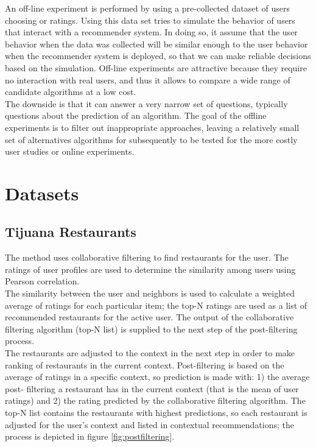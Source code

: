 An off-line experiment is performed by using a pre-collected dataset
of users choosing or ratings. Using this data set tries to simulate
the behavior of users that interact with a recommender system. In
doing so, it assume that the user behavior when the data was collected
will be similar enough to the user behavior when the recommender
system is deployed, so that we can make reliable decisions based on
the simulation.  Off-line experiments are attractive because they
require no interaction with real users, and thus it allows to compare
a wide range of candidate algorithms at a low cost. \\ The downside is
that it can answer a very narrow set of questions, typically questions
about the prediction of an algorithm. The goal of the offline
experiments is to filter out inappropriate  approaches, leaving a
relatively small set of alternatives algorithms for subsequently to be
tested for the more costly user studies or online 
experiments\cite{adomavicius2011context}.

\section{Datasets} 

\subsection{Tijuana Restaurants} 

The method uses collaborative filtering to find restaurants for the
user\cite{ramirez2013restaurant}. The ratings of user profiles are
used to determine the similarity among users using Pearson
correlation.\\ The similarity between the user and  neighbors is
used to calculate a weighted average of ratings for each particular
item;  the top-N ratings are used as a list of recommended restaurants
for the active user. The output of the collaborative filtering
algorithm (top-N list) is supplied to the next step of the 
post-filtering process. \\The restaurants are adjusted to the context in
the next step in order to make ranking of restaurants in the current
context. Post-filtering is based on the average of ratings in a
specific context, so prediction is made with: 1) the average post-
filtering a restaurant has in the current context (that is the mean of
user ratings) and 2) the rating predicted by the collaborative
filtering algorithm. The top-N list contains the restaurants with
highest predictions, so each restaurant is adjusted for the user’s
context and listed in contextual recommendations; the process is
depicted in figure \ref{fig:postfiltering}.

